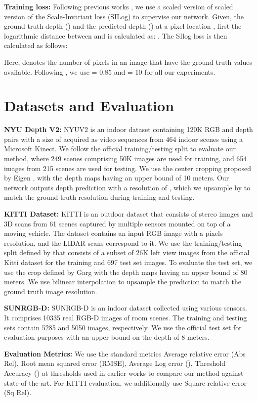 \documentclass[10pt,twocolumn,letterpaper]{article}
\newcommand{\myfirstpara}[1]{\par \noindent \textbf{#1:}}
\newcommand{\mypara}[1]{\vspace{0.5em} \myfirstpara{#1}}
\begin{document}
\mypara{Training loss}
Following previous works \cite{newcrf, adabins}, we use a scaled version of scaled version of the Scale-Invariant loss (SILog) \cite{eigen} to supervise our network. Given, the ground truth depth () and the predicted depth () at a pixel location , first the logarithmic distance between  and  is calculated as: . The SIlog loss is then calculated as follows:

Here,  denotes the number of pixels in an image that have the ground truth values available. Following \cite{adabins}, we use  = 0.85 and  = 10 for all our experiments.  
\section{Datasets and Evaluation}
\myfirstpara{NYU Depth V2}
NYUV2 \cite{nyu} is an indoor dataset containing 120K RGB and depth pairs with a size of  acquired as video sequences from 464 indoor scenes using a Microsoft Kinect. We follow the official training/testing split to evaluate our method, where 249 scenes comprising 50K images are used for training, and 654 images from 215 scenes are used for testing. We use the center cropping proposed by Eigen \etal \cite{eigen}, with the depth maps having an upper bound of 10 meters. Our network outputs depth prediction with a resolution of , which we upsample by  to match the ground truth resolution during training and testing.

\mypara{KITTI Dataset} 
KITTI \cite{kitti} is an outdoor dataset that consists of stereo images and 3D scans from 61 scenes captured by multiple sensors mounted on top of a moving vehicle. The dataset contains an input RGB image with a  pixels resolution, and the LIDAR scans correspond to it. We use the training/testing split defined by \cite{eigen} that consists of a subset of 26K left view images from the official Kitti dataset for the training and 697 test set images. To evaluate the test set, we use the crop defined by Garg \etal \cite{garg} with the depth maps having an upper bound of 80 meters. We use bilinear interpolation to upsample the prediction to match the ground truth image resolution.

\mypara{SUNRGB-D}
SUNRGB-D \cite{Song_2015_CVPR} is an indoor dataset collected using various sensors. It comprises 10335 real RGB-D images of room scenes. The training and testing sets contain 5285 and 5050 images, respectively. We use the official test set for evaluation purposes with an upper bound on the depth of 8 meters.

\mypara{Evaluation Metrics}
We use the standard metrics Average relative error (Abs Rel), Root mean squared error (RMSE), Average Log error (), Threshold Accuracy () at thresholds  used in earlier works \cite{eigen, adabins, newcrf} to compare our method against state-of-the-art. For KITTI evaluation, we additionally use Square relative error (Sq Rel).
%
 
\end{document}
